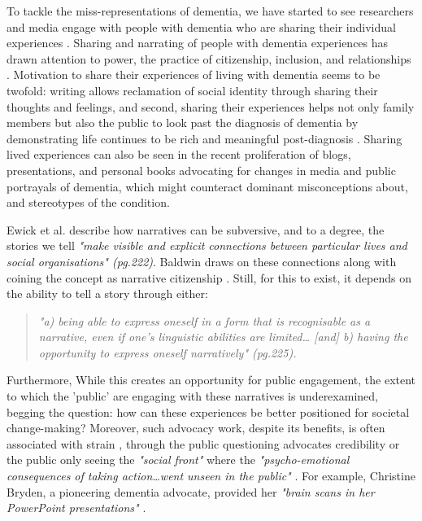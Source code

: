 To tackle the miss-representations of dementia, we have started to see researchers and media engage with people with dementia who are sharing their individual experiences \citep{peel2014living}. Sharing and narrating of people with dementia experiences has drawn attention to power, the practice of citizenship, inclusion, and relationships \citep{villar_giving_2019,bartlett_citizenship_2014}. Motivation to share their experiences of living with dementia seems to be twofold: writing allows reclamation of social identity through sharing their thoughts and feelings, and second, sharing their experiences helps not only family members but also the public to look past the diagnosis of dementia by demonstrating life continues to be rich and meaningful post-diagnosis \citep{schorch_designing_2016, ryan_dementia_2009}. Sharing lived experiences can also be seen in the recent proliferation of blogs, presentations, and personal books advocating \citep{bryden_challenging_2020, christine_bryden_dancing_2005,nolan_perceptions_2006} for changes in media and public portrayals of dementia, which might counteract dominant misconceptions about, and stereotypes of the condition. 

Ewick et al. describe how narratives can be subversive, and to a degree, the stories we tell \textit{"make visible and explicit connections between particular lives and social organisations" \citep{ewick_subversive_1995} (pg.222)}. Baldwin draws on these connections along with coining the concept as narrative citizenship \citep{baldwin_narrative_2008}. Still, for this to exist, it depends on the ability to tell a story through either:
\begin{quote}
   \textit{"a) being able to express oneself in a form that is recognisable as a narrative, even if one's linguistic abilities are limited… [and] b) having the opportunity to express oneself narratively" \citep{baldwin_narrative_2008} (pg.225). }
\end{quote}

 Furthermore, While this creates an opportunity for public engagement, the extent to which the 'public' are engaging with these narratives is underexamined, begging the question: how can these experiences be better positioned for societal change-making? Moreover, such advocacy work, despite its benefits, is often associated with strain \citep{suijkerbuijk_active_2019}, through the public questioning advocates credibility or the public only seeing the \textit{"social front"} where the \textit{"psycho-emotional consequences of taking action…went unseen in the public" } \citep{bartlett_citizenship_2014}. For example, Christine Bryden, a pioneering dementia advocate, provided her \textit{"brain scans in her PowerPoint presentations"} \citep{swaffer_but_2016} . 

